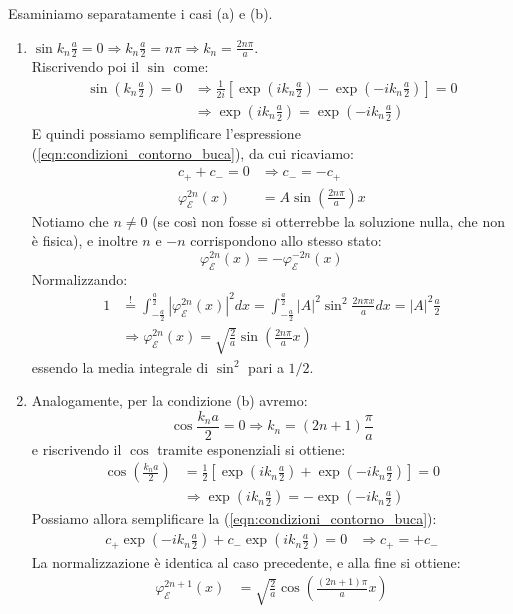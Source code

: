 \documentclass[../../FisicaTeorica.tex]{subfiles}
\begin{document}
Esaminiamo separatamente i casi (a) e (b).
\begin{enumerate}[label=\alph*)]
\item $\displaystyle \sin k_n \frac{a}{2} = 0\Rightarrow k_n \frac{a}{2}=n\pi \Rightarrow k_n = \frac{2n\pi}{a}$.\\
Riscrivendo poi il $\sin$ come:
\begin{align*}
\sin\left(k_n\frac{a}{2}\right)=0&\Rightarrow \frac{1}{2i}\left[
\exp\left(ik_n\frac{a}{2}\right)-\exp\left(-ik_n\frac{a}{2}\right)
\right] = 0\\
&\Rightarrow \exp\left({ik_n\frac{a}{2}}\right)=\exp\left({-ik_n\frac{a}{2}}\right)
\end{align*}
E quindi possiamo semplificare l'espressione (\ref{eqn:condizioni_contorno_buca}), da cui ricaviamo:
\begin{align*}
c_+ + c_- = 0 &\Rightarrow c_- = -c_+\\
\varphi_\mathcal{E}^{2n}(x)&=A\sin \left(\frac{2n\pi}{a}\right) x
\end{align*}
Notiamo che $n\neq 0$ (se così non fosse si otterrebbe la soluzione nulla, che non è fisica), e inoltre $n$ e $-n$ corrispondono allo stesso stato:
\[
\varphi_\mathcal{E}^{2n}(x)=-\varphi_{\mathcal{E}}^{-2n}(x)
\]
Normalizzando:
\begin{align*}
1 &\overset{!}{=} \int_{-\frac{a}{2}}^{\frac{a}{2}} |\varphi_\mathcal{E}^{2n}(x)|^2 dx = \int_{-\frac{a}{2}}^{\frac{a}{2}} |A|^2 \sin^2 \frac{2n\pi x}{a}dx = |A|^2 \frac{a}{2} \\
&\Rightarrow \varphi_\mathcal{E}^{2n}(x)=\sqrt{\frac{2}{a}}\sin \left(\frac{2n\pi}{a}x\right)
\end{align*}
essendo la media integrale di $\sin^2$ pari a $1/2$.
\item Analogamente, per la condizione (b) avremo:
\[
\cos\frac{k_n a}{2}=0 \Rightarrow k_n = (2n+1)\frac{\pi}{a}
\]
e riscrivendo il $\cos$ tramite esponenziali si ottiene:
\begin{align*}
\cos\left(\frac{k_n a}{2}\right ) &= \frac{1}{2}\left [
\exp\left(i k_n \frac{a}{2}\right)+\exp\left(-ik_n\frac{a}{2}\right)
\right ] = 0\\
&\Rightarrow \exp\left({ik_n \frac{a}{2}}\right)=-\exp\left({-ik_n\frac{a}{2}}\right)
\end{align*}
Possiamo allora semplificare la (\ref{eqn:condizioni_contorno_buca}):
\begin{align*}
c_+ \exp\left({-ik_n\frac{a}{2}}\right)+c_- \exp\left({ik_n \frac{a}{2}}\right)=0 &\Rightarrow c_+ = +c_-
\end{align*}
La normalizzazione è identica al caso precedente, e alla fine si ottiene:
\begin{align*}
\varphi_{\mathcal{E}}^{2n+1}(x)&=\sqrt{\frac{2}{a}}\cos\left(\frac{(2n+1)\pi}{a} x\right)
\end{align*}
\end{enumerate}
\end{document}
